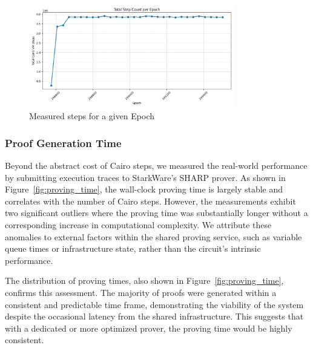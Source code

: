 \documentclass[runningheads]{llncs}
\begin{document}
\begin{figure}[H]
    \centering
    \includegraphics[width=0.8\textwidth]{diagrams/step_count_vs_epoch.png}
    \caption{Measured steps for a given Epoch}
    \label{fig:light_client_steps}
\end{figure}

\subsubsection{Proof Generation Time}
Beyond the abstract cost of Cairo steps, we measured the real-world performance by submitting execution traces to StarkWare's SHARP prover. As shown in Figure~\ref{fig:proving_time}, the wall-clock proving time is largely stable and correlates with the number of Cairo steps. However, the measurements exhibit two significant outliers where the proving time was substantially longer without a corresponding increase in computational complexity. We attribute these anomalies to external factors within the shared proving service, such as variable queue times or infrastructure state, rather than the circuit's intrinsic performance.

The distribution of proving times, also shown in Figure~\ref{fig:proving_time}, confirms this assessment. The majority of proofs were generated within a consistent and predictable time frame, demonstrating the viability of the system despite the occasional latency from the shared infrastructure. This suggests that with a dedicated or more optimized prover, the proving time would be highly consistent.
\end{document}
